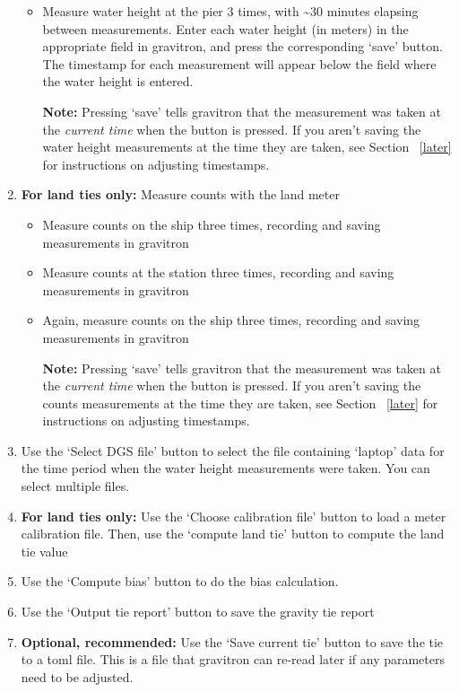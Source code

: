 \documentclass{pfpe-manual}
\begin{document}
\begin{enumerate}
    \begin{itemize}
    \item Measure water height at the pier 3 times, with \textasciitilde 30 minutes elapsing between measurements. Enter each water height (in meters) in the appropriate field in gravitron, and press the corresponding `save' button. The timestamp for each measurement will appear below the field where the water height is entered.
    \item[\textbf{Note:}] Pressing `save' tells gravitron that the measurement was taken at the \textit{current time} when the button is pressed. If you aren't saving the water height measurements at the time they are taken, see Section ~\ref{later} for instructions on adjusting timestamps.
    \end{itemize}
\item \textbf{For land ties only:} Measure counts with the land meter
    \begin{itemize}
    \item Measure counts on the ship three times, recording and saving measurements in gravitron
    \item Measure counts at the station three times, recording and saving measurements in gravitron
    \item Again, measure counts on the ship three times, recording and saving measurements in gravitron
    \item[\textbf{Note:}] Pressing `save' tells gravitron that the measurement was taken at the \textit{current time} when the button is pressed. If you aren't saving the counts measurements at the time they are taken, see Section ~\ref{later} for instructions on adjusting timestamps.
    \end{itemize}
\item Use the `Select DGS file' button to select the file containing `laptop' data for the time period when the water height measurements were taken. You can select multiple files.
\item \textbf{For land ties only:} Use the `Choose calibration file' button to load a meter calibration file. Then, use the `compute land tie' button to compute the land tie value
\item Use the `Compute bias' button to do the bias calculation.
\item Use the `Output tie report' button to save the gravity tie report
\item \textbf{Optional, recommended:} Use the `Save current tie' button to save the tie to a toml file. This is a file that gravitron can re-read later if any parameters need to be adjusted.
\end{enumerate}
\end{document}

